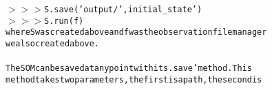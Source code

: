{{\begin{tabbing}
{\texttt{$>$$>$$>$\hspace{6pt}S.save({'}output/{'},\hspace{6pt}{'}initial\_state{'})}}\\
{\texttt{$>$$>$$>$\hspace{6pt}S.run(f)}}\\
{\texttt{where\hspace{6pt}S\hspace{6pt}was\hspace{6pt}created\hspace{6pt}above\hspace{6pt}and\hspace{6pt}f\hspace{6pt}was\hspace{6pt}the\hspace{6pt}observation\hspace{6pt}file\hspace{6pt}manager}}\\
{\texttt{we\hspace{6pt}also\hspace{6pt}created\hspace{6pt}above.}}\\
\\
{\texttt{The\hspace{6pt}SOM\hspace{6pt}can\hspace{6pt}be\hspace{6pt}saved\hspace{6pt}at\hspace{6pt}any\hspace{6pt}point\hspace{6pt}with\hspace{6pt}its\hspace{6pt}{'}.save{'}\hspace{6pt}method.\hspace{6pt}This}}\\
{\texttt{method\hspace{6pt}takes\hspace{6pt}two\hspace{6pt}parameters,\hspace{6pt}the\hspace{6pt}first\hspace{6pt}is\hspace{6pt}a\hspace{6pt}path,\hspace{6pt}the\hspace{6pt}second\hspace{6pt}is}}\\

\end{tabbing}}}
